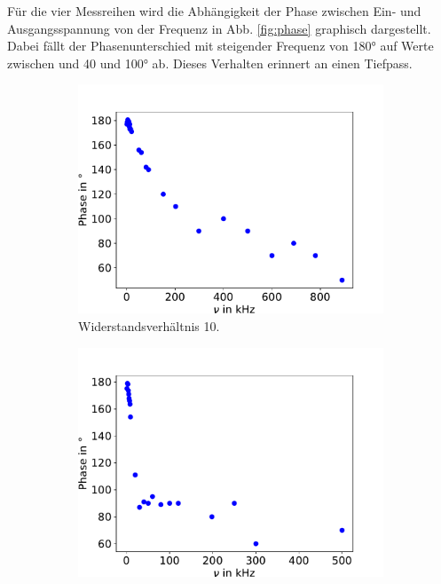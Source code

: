                 Für die vier Messreihen wird die Abhängigkeit der Phase zwischen Ein- und Ausgangsspannung
                von der Frequenz in Abb. \ref{fig:phase} graphisch dargestellt. Dabei fällt der Phasenunterschied
                mit steigender Frequenz von 180° auf Werte zwischen und 40 und 100° ab. Dieses Verhalten erinnert 
                an einen Tiefpass.

                \begin{figure}[H]
                    \centering
                    \begin{subfigure}{0.48\textwidth}
                        \centering
                        \includegraphics[width=\textwidth]{phase1.pdf}%
                        \caption{Widerstandsverhältnis 10.}
                        \label{fig:pep2}
                    \end{subfigure}
                    \begin{subfigure}{0.48\textwidth}
                        \centering
                        \includegraphics[width=\textwidth]{phase2.pdf}%

\end{subfigure}
\end{figure}
